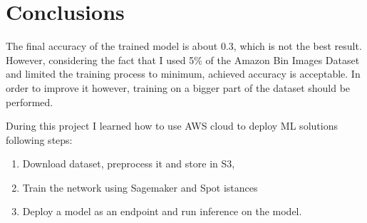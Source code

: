 \documentclass{article}
\begin{document}
\section{Conclusions}
The final accuracy of the trained model is about $0.3$, which is not the best result. However, considering the fact that I used 5\% of the Amazon Bin Images Dataset and limited the training process to minimum, achieved accuracy is acceptable. In order to improve it however, training on a bigger part of the dataset should be performed. 

During this project I learned how to use AWS cloud to deploy ML solutions following steps:
\begin{enumerate}
	\item Download dataset, preprocess it and store in S3,
	\item Train the network using Sagemaker and Spot istances
	\item Deploy a model as an endpoint and run inference on the model.
\end{enumerate}
\end{document}
